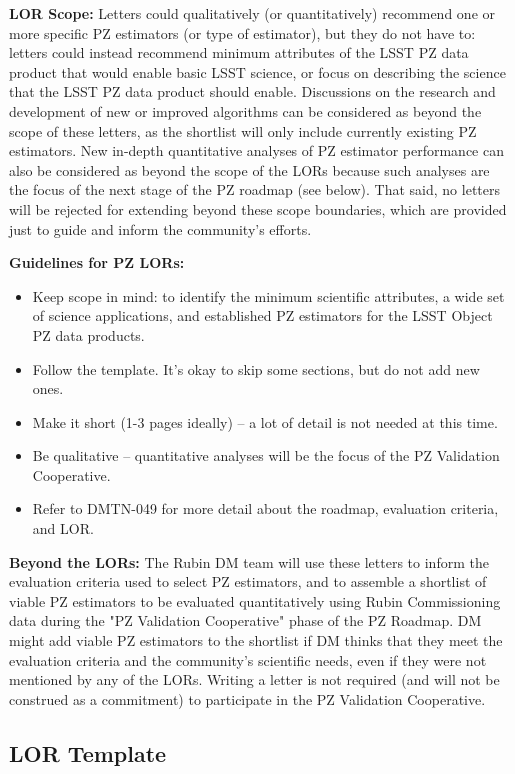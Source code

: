 \documentclass[DM,authoryear,toc]{lsstdoc}
\begin{document}
\textbf{LOR Scope:}
Letters could qualitatively (or quantitatively) recommend one or more specific PZ estimators (or type of estimator), but they do not have to: letters could instead recommend minimum attributes of the LSST PZ data product that would enable basic LSST science, or focus on describing the science that the LSST PZ data product should enable.
Discussions on the research and development of new or improved algorithms can be considered as beyond the scope of these letters, as the shortlist will only include currently existing PZ estimators. 
New in-depth quantitative analyses of PZ estimator performance can also be considered as beyond the scope of the LORs because such analyses are the focus of the next stage of the PZ roadmap (see below).
That said, no letters will be rejected for extending beyond these scope boundaries, which are provided just to guide and inform the community's efforts. 

\textbf{Guidelines for PZ LORs:}
\begin{itemize}
\item Keep scope in mind: to identify the minimum scientific attributes, a wide set of science applications, and established PZ estimators for the LSST Object PZ data products.
\item Follow the template. It's okay to skip some sections, but do not add new ones.
\item Make it short (1-3 pages ideally) -- a lot of detail is not needed at this time.
\item Be qualitative -- quantitative analyses will be the focus of the PZ Validation Cooperative.
\item Refer to DMTN-049 for more detail about the roadmap, evaluation criteria, and LOR.
\end{itemize}

\textbf{Beyond the LORs:}
The Rubin DM team will use these letters to inform the evaluation criteria used to select PZ estimators, and to assemble a shortlist of viable PZ estimators to be evaluated quantitatively using Rubin Commissioning data during the "PZ Validation Cooperative" phase of the PZ Roadmap.
DM might add viable PZ estimators to the shortlist if DM thinks that they meet the evaluation criteria and the community's scientific needs, even if they were not mentioned by any of the LORs.
Writing a letter is not required (and will not be construed as a commitment) to participate in the PZ Validation Cooperative. 

\subsection{LOR Template}
\end{document}

